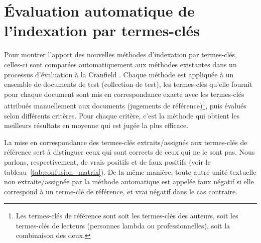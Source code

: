  \section{Évaluation automatique de l'indexation par termes-clés}
  \label{sec:main-state_of_the_art-automatic_evaluation_of_keyphrase_annotation}
    Pour montrer l'apport des nouvelles méthodes d'indexation par termes-clés,
    celles-ci sont comparées automatiquement aux méthodes existantes dans un
    processus d'évaluation \og{}à la Cranfield\fg{}
    \citep{voorhees2002philosophy}. Chaque méthode est appliquée à un ensemble
    de documents de test (collection de test), les termes-clés qu'elle fournit
    pour chaque document sont mis en correspondance \og{}exacte\fg{} avec les
    termes-clés attribués manuellement aux documents (jugements de
    référence)\footnote{Les termes-clés de référence sont soit les termes-clés
    des auteurs, soit les termes-clés de lecteurs (personnes lambda ou
    professionnelles), soit la combinaison des deux.}, puis évalués selon
    différents critères. Pour chaque critère, c'est la méthode qui obtient les
    meilleurs résultats en moyenne qui est jugée la plus efficace.
  
    La mise en correspondance des termes-clés extraits/assignés aux termes-clés
    de référence sert à distinguer ceux qui sont corrects de ceux qui ne le sont
    pas. Nous parlons, respectivement, de vrais positifs et de faux positifs
    (voir le
    tableau~\ref{tab:confusion_matrix}). De la même manière, toute autre unité
    textuelle non extraite/assignée par la méthode automatique est appelée faux
    négatif si elle correspond à un terme-clé de référence, et vrai négatif dans
    le cas contraire.
    
